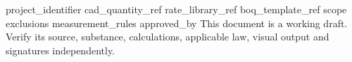 \documentclass[11pt,a4paper]{article}
\begin{document}
{{project_identifier}}
{{cad_quantity_ref}}
{{rate_library_ref}}
{{boq_template_ref}}
{{scope}}
{{exclusions}}
{{measurement_rules}}
{{approved_by}}
This document is a working draft. Verify its source, substance, calculations, applicable law, visual output and signatures independently.
\end{document}
